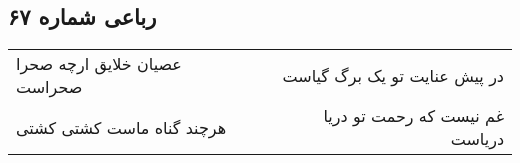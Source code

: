 \begin{center}
\section*{رباعی شماره ۶۷}
\label{sec:sh067}
\begin{longtable}{l p{0.5cm} r}
عصیان خلایق ارچه صحرا صحراست
&&
در پیش عنایت تو یک برگ گیاست
\\
هرچند گناه ماست کشتی کشتی
&&
غم نیست که رحمت تو دریا دریاست
\\
\end{longtable}
\end{center}
